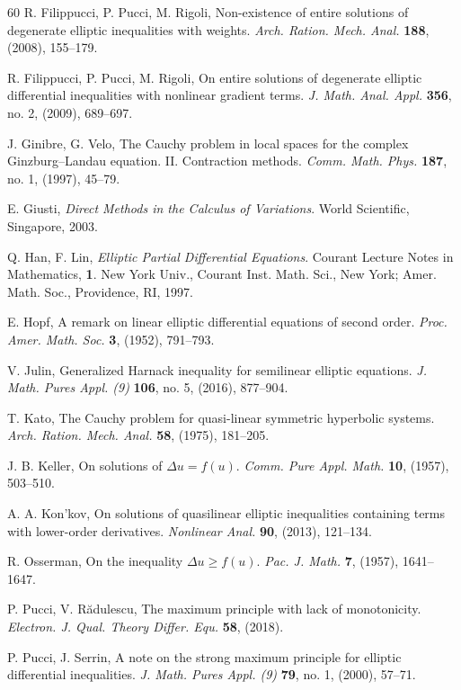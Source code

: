 \documentclass[12pt,a4paper]{amsart}
\numberwithin{equation}{section} %
\theoremstyle{definition}
\theoremstyle{remark}
\begin{document}
\begin{thebibliography}{60}
 {\sc R. Filippucci, P. Pucci, M. Rigoli}, 
{ Non-existence of entire solutions of degenerate elliptic inequalities with weights}. 
{\em Arch. Ration. Mech. Anal.} {\bf 188}, (2008), 155--179.
    
 {\sc R. Filippucci,  P. Pucci, M. Rigoli}, 
{On entire solutions of degenerate elliptic differential inequalities with nonlinear gradient terms}. 
{\em J. Math. Anal. Appl.} {\bf 356}, no. 2, (2009), 689--697.

 {\sc J. Ginibre, G. Velo}, 
{ The Cauchy problem in local spaces for the complex Ginzburg--Landau equation. II. Contraction methods}. 
{\em Comm. Math. Phys.} {\bf 187}, no. 1, (1997), 45--79.

 {\sc E. Giusti}, {\em Direct Methods in the Calculus of Variations}. World Scientific, Singapore, 2003.

 {\sc Q. Han, F. Lin}, 
{\em Elliptic Partial Differential Equations}. Courant Lecture Notes in Mathematics, 
{\bf 1}. New York Univ., Courant Inst. Math. Sci., New York; Amer. Math. Soc., Providence, RI, 1997.

 {\sc E. Hopf}, 
{ A remark on linear elliptic differential equations of second order}. 
{\em Proc. Amer. Math. Soc.} {\bf 3}, (1952), 791--793.

 {\sc V. Julin}, 
{ Generalized Harnack inequality for semilinear elliptic equations}. 
{\em J. Math. Pures Appl. (9)} {\bf 106}, no. 5, (2016), 877--904.

 {\sc T. Kato}, 
{ The Cauchy problem for quasi-linear symmetric hyperbolic systems}. 
{\em Arch. Ration. Mech. Anal.} {\bf 58}, (1975), 181--205.

 {\sc J. B. Keller}, 
{ On solutions of $\Delta u = f(u)$}. 
{\em Comm. Pure Appl. Math.} {\bf 10}, (1957), 503--510.

 {\sc A. A. Kon'kov}, 
{ On solutions of quasilinear elliptic inequalities containing terms with lower-order derivatives}. 
{\em Nonlinear Anal.} {\bf 90}, (2013), 121--134.

 {\sc R. Osserman}, 
{ On the inequality $\Delta u \geq f(u)$}. 
{\em Pac. J. Math.} {\bf 7}, (1957), 1641--1647.    

 {\sc P. Pucci, V. R\u{a}dulescu}, 
{ The maximum principle with lack of monotonicity}. 
{\em Electron. J. Qual. Theory Differ. Equ.} {\bf 58}, (2018).

 {\sc P. Pucci, J. Serrin}, 
{ A note on the strong maximum principle for elliptic differential inequalities}. 
{\em J. Math. Pures Appl. (9)} {\bf 79}, no. 1, (2000), 57--71.
    

\end{thebibliography}
\end{document}
